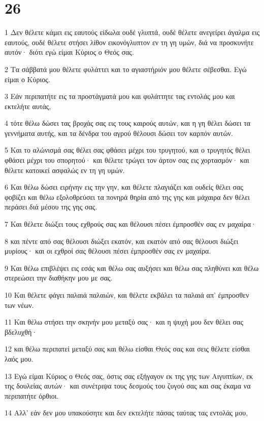 \chapter{26}

\par 1 Δεν θέλετε κάμει εις εαυτούς είδωλα ουδέ γλυπτά, ουδέ θέλετε ανεγείρει άγαλμα εις εαυτούς, ουδέ θέλετε στήσει λίθον εικονόγλυπτον εν τη γη υμών, διά να προσκυνήτε αυτόν· διότι εγώ είμαι Κύριος ο Θεός σας.
\par 2 Τα σάββατά μου θέλετε φυλάττει και το αγιαστήριόν μου θέλετε σέβεσθαι. Εγώ είμαι ο Κύριος.
\par 3 Εάν περιπατήτε εις τα προστάγματά μου και φυλάττητε τας εντολάς μου και εκτελήτε αυτάς,
\par 4 τότε θέλω δώσει τας βροχάς σας εις τους καιρούς αυτών, και η γη θέλει δώσει τα γεννήματα αυτής, και τα δένδρα του αγρού θέλουσι δώσει τον καρπόν αυτών.
\par 5 Και το αλώνισμά σας θέλει σας φθάσει μέχρι του τρυγητού, και ο τρυγητός θέλει φθάσει μέχρι του σπορητού· και θέλετε τρώγει τον άρτον σας εις χορτασμόν· και θέλετε κατοικεί ασφαλώς εν τη γη υμών.
\par 6 Και θέλω δώσει ειρήνην εις την γην, και θέλετε πλαγιάζει και ουδείς θέλει σας φοβίζει και θέλω εξολοθρεύσει τα πονηρά θηρία από της γης και μάχαιρα δεν θέλει περάσει διά μέσου της γης σας.
\par 7 Και θέλετε διώξει τους εχθρούς σας και θέλουσι πέσει έμπροσθέν σας εν μαχαίρα·
\par 8 και πέντε από σας θέλουσι διώξει εκατόν, και εκατόν από σας θέλουσι διώξει μυρίους· και οι εχθροί σας θέλουσι πέσει έμπροσθέν σας εν μαχαίρα.
\par 9 Και θέλω επιβλέψει εις εσάς και θέλω σας αυξήσει και θέλω σας πληθύνει και θέλω στερεώσει την διαθήκην μου με σας.
\par 10 Και θέλετε φάγει παλαιά παλαιών, και θέλετε εκβάλει τα παλαιά απ' έμπροσθεν των νέων.
\par 11 Και θέλω στήσει την σκηνήν μου μεταξύ σας· και η ψυχή μου δεν θέλει σας βδελυχθή·
\par 12 και θέλω περιπατεί μεταξύ σας και θέλω είσθαι Θεός σας και σεις θέλετε είσθαι λαός μου.
\par 13 Εγώ είμαι Κύριος ο Θεός σας, όστις σας εξήγαγον εκ της γης των Αιγυπτίων, εκ της δουλείας αυτών· και συνέτριψα τους δεσμούς του ζυγού σας και σας έκαμα να περιπατήτε όρθιοι.
\par 14 Αλλ' εάν δεν μου υπακούσητε και δεν εκτελήτε πάσας ταύτας τας εντολάς μου,
